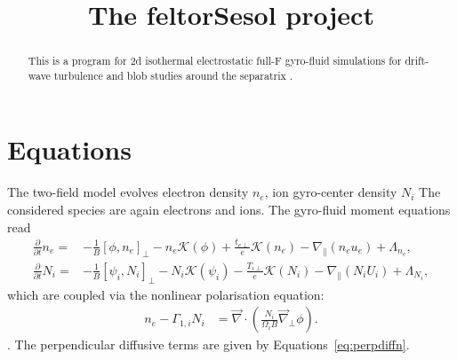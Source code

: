 





\title{The feltorSesol project}
\maketitle

\begin{abstract}
    This is a program for 2d isothermal electrostatic full-F gyro-fluid simulations for drift-wave turbulence and blob studies around the separatrix \cite{HeldPhd}.
\end{abstract}

\section{Equations}
The two-field model evolves electron density 
\(n_e\), ion gyro-center density \(N_i\)
The considered species are again electrons and ions. The gyro-fluid moment equations read 
\begin{align}\label{eq:2Desolne}
\frac{\partial}{\partial t} n_e =&-
\frac{1}{B} \left[\phi,n_e \right]_{\perp} - n_e \mathcal{K}\left(\phi \right) + \frac{t_{e\perp}}{e} \mathcal{K}\left( n_e \right) 
-\nabla_\parallel \left(n_e u_e\right)
+  \Lambda_{n_e}  ,
\\
\label{eq:2DesolNi}
\frac{\partial}{\partial t} N_i =&
-\frac{1}{B} \left[\psi_i,N_i \right]_{\perp}- N_i \mathcal{K}\left(\psi_i \right) 
- \frac{T_{i\perp}}{e} \mathcal{K}\left( N_i \right) 
-\nabla_\parallel \left(N_i U_i\right)
+  \Lambda_{N_i}  ,
\end{align}
which are coupled via the nonlinear polarisation equation:
\begin{align}\label{eq:hwpol}
  n_e -\Gamma_{1,i} N_i &= \vec{\nabla} \cdot\left(\frac{N_i}{\Omega_i B} \vec{\nabla}_\perp \phi\right).
\end{align}.
The perpendicular diffusive terms are given by Equations~\eqref{eq:perpdiffn}.
